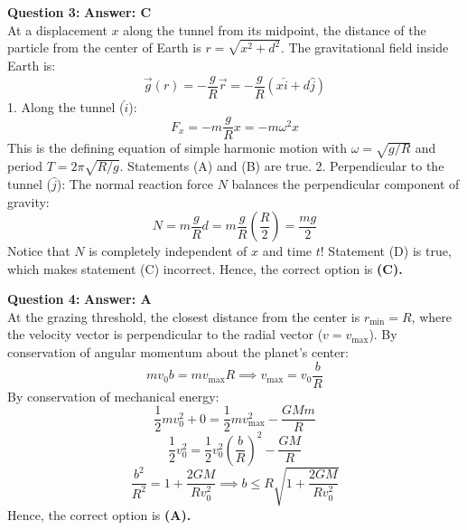 \documentclass[11pt,a4paper]{article}
\begin{document}
\begin{tcolorbox}[solbox]
  \textbf{\textcolor{primaryDark}{Question 3:}} \hfill \textbf{\textcolor{l3Crimson}{Answer: C}}\\
  \vspace{3pt}
  At a displacement $x$ along the tunnel from its midpoint, the distance of the particle from the center of Earth is $r = \sqrt{x^2 + d^2}$.
\vspace{3pt}
The gravitational field inside Earth is:
$$\vec{g}(r) = -\frac{g}{R}\vec{r} = -\frac{g}{R}(x\hat{i} + d\hat{j})$$
\vspace{3pt}
1. Along the tunnel ($\hat{i}$):
$$F_x = -m\frac{g}{R}x = -m\omega^2 x$$
This is the defining equation of simple harmonic motion with $\omega = \sqrt{g/R}$ and period $T = 2\pi\sqrt{R/g}$. Statements (A) and (B) are true.
\vspace{3pt}
2. Perpendicular to the tunnel ($\hat{j}$):
The normal reaction force $N$ balances the perpendicular component of gravity:
$$N = m\frac{g}{R}d = m\frac{g}{R}\left(\frac{R}{2}\right) = \frac{mg}{2}$$
Notice that $N$ is completely independent of $x$ and time $t$! Statement (D) is true, which makes statement (C) incorrect.
\vspace{3pt}
Hence, the correct option is \textbf{(C)}\textbf{.}
\end{tcolorbox}
\vspace{3pt}

\begin{tcolorbox}[solbox]
  \textbf{\textcolor{primaryDark}{Question 4:}} \hfill \textbf{\textcolor{l3Crimson}{Answer: A}}\\
  \vspace{3pt}
  At the grazing threshold, the closest distance from the center is $r_{\min} = R$, where the velocity vector is perpendicular to the radial vector ($v = v_{\max}$).
\vspace{3pt}
By conservation of angular momentum about the planet's center:
$$m v_0 b = m v_{\max} R \implies v_{\max} = v_0 \frac{b}{R}$$
\vspace{3pt}
By conservation of mechanical energy:
$$\frac{1}{2}m v_0^2 + 0 = \frac{1}{2}m v_{\max}^2 - \frac{GMm}{R}$$
$$\frac{1}{2}v_0^2 = \frac{1}{2}v_0^2\left(\frac{b}{R}\right)^2 - \frac{GM}{R}$$
$$\frac{b^2}{R^2} = 1 + \frac{2GM}{R v_0^2} \implies b \le R\sqrt{1 + \frac{2GM}{R v_0^2}}$$
\vspace{3pt}
Hence, the correct option is \textbf{(A)}\textbf{.}
\end{tcolorbox}
\vspace{3pt}
\end{document}
